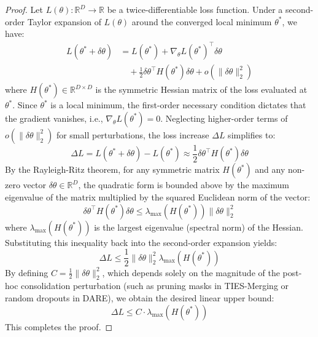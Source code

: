 \begin{proof}
  Let $L(\theta): \mathbb{R}^D \to \mathbb{R}$ be a twice-differentiable loss function. Under a second-order Taylor expansion of $L(\theta)$ around the converged local minimum $\theta^*$, we have:
  \begin{align}
    L(\theta^* + \delta\theta) &= L(\theta^*) + \nabla_\theta L(\theta^*)^\top \delta\theta \nonumber \\
    &\quad + \frac{1}{2} \delta\theta^\top H(\theta^*) \delta\theta + o(\|\delta\theta\|_2^2)
  \end{align}
  where $H(\theta^*) \in \mathbb{R}^{D \times D}$ is the symmetric Hessian matrix of the loss evaluated at $\theta^*$. Since $\theta^*$ is a local minimum, the first-order necessary condition dictates that the gradient vanishes, i.e., $\nabla_\theta L(\theta^*) = 0$. Neglecting higher-order terms of $o(\|\delta\theta\|_2^2)$ for small perturbations, the loss increase $\Delta L$ simplifies to:
  \begin{equation}
    \Delta L = L(\theta^* + \delta\theta) - L(\theta^*) \approx \frac{1}{2} \delta\theta^\top H(\theta^*) \delta\theta
  \end{equation}
  By the Rayleigh-Ritz theorem, for any symmetric matrix $H(\theta^*)$ and any non-zero vector $\delta\theta \in \mathbb{R}^D$, the quadratic form is bounded above by the maximum eigenvalue of the matrix multiplied by the squared Euclidean norm of the vector:
  \begin{equation}
    \delta\theta^\top H(\theta^*) \delta\theta \le \lambda_{\max}(H(\theta^*)) \|\delta\theta\|_2^2
  \end{equation}
  where $\lambda_{\max}(H(\theta^*))$ is the largest eigenvalue (spectral norm) of the Hessian. Substituting this inequality back into the second-order expansion yields:
  \begin{equation}
    \Delta L \le \frac{1}{2} \|\delta\theta\|_2^2 \lambda_{\max}(H(\theta^*))
  \end{equation}
  By defining $C = \frac{1}{2} \|\delta\theta\|_2^2$, which depends solely on the magnitude of the post-hoc consolidation perturbation (such as pruning masks in TIES-Merging or random dropouts in DARE), we obtain the desired linear upper bound:
  \begin{equation}
    \Delta L \le C \cdot \lambda_{\max}(H(\theta^*))
  \end{equation}
  This completes the proof.
\end{proof}

